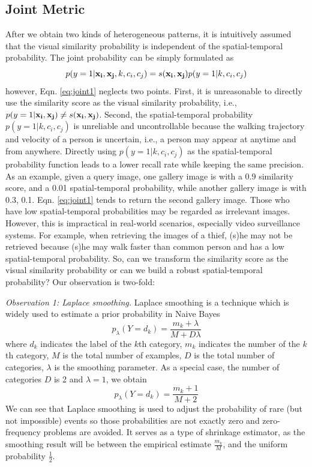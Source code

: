 \documentclass[letterpaper]{article} %
\begin{document}
\subsection{Joint Metric}
After we obtain two kinds of heterogeneous patterns, it is intuitively assumed that the visual similarity probability is independent of the spatial-temporal probability. The joint probability can be simply formulated as
\begin{equation}
    \label{eq:joint1}
    p(y=1|{\bf{x_i}},{\bf{x_j}},k,c_i,c_j) = s({\bf{x_i}},{\bf{x_j}})p(y=1|k,c_i,c_j)
\end{equation}
however, Eqn. \ref{eq:joint1} neglects two points. First, it is unreasonable to directly use the similarity score as the visual similarity probability, i.e., $p(y=1|{\bf{x_i}},{\bf{x_j}})\neq s({\bf{x_i}},{\bf{x_j}})$. Second, the spatial-temporal probability $p(y=1|k,c_i,c_j)$ is unreliable and uncontrollable because the walking trajectory and velocity of a person is uncertain, i.e., a person may appear at anytime and from anywhere. Directly using $p(y=1|k,c_i,c_j)$ as the spatial-temporal probability function leads to a lower recall rate while keeping the same precision. As an example, given a query image, one gallery image is with a 0.9 similarity score, and a 0.01 spatial-temporal probability, while another gallery image is with 0.3, 0.1. Eqn. \ref{eq:joint1} tends to return the second gallery image. Those who have low spatial-temporal probabilities may be regarded as irrelevant images. However, this is impractical in real-world scenarios, especially video surveillance systems. For example, when retrieving the images of a thief, (s)he may not be retrieved because (s)he may walk faster than common person and has a low spatial-temporal probability. So, can we transform the similarity score as the visual similarity probability or can we build a robust spatial-temporal probability? Our observation is two-fold:

\emph{Observation 1: Laplace smoothing.} Laplace smoothing is a technique which is widely used to estimate a prior probability in Naive Bayes
\begin{equation}
    \label{eq:Laplace}
    {p_\lambda }(Y = {d_k}) = \frac{{{m_k} + \lambda}}{{M + D\lambda }}
\end{equation}
where $d_k$ indicates the label of the $k$th category, $m_k$ indicates the number of the $k$th category, $M$ is the total number of examples, $D$ is the total number of categories, $\lambda$ is the smoothing parameter. As a special case, the number of categories $D$ is 2 and $\lambda=1$, we obtain
\begin{equation}
    \label{eq:Laplace2}
    {p_\lambda }(Y = {d_k}) = \frac{{{m_k} + 1}}{{M + 2}}
\end{equation}
We can see that Laplace smoothing is used to adjust the probability of rare (but not impossible) events so those probabilities are not exactly zero and zero-frequency problems are avoided. It serves as a type of shrinkage estimator, as the smoothing result will be between the empirical estimate $\frac{{{m_k}}}{M}$, and the uniform probability $\frac{{{1}}}{2}$.
\end{document}
